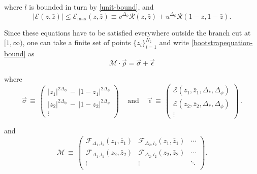 \documentclass[letterpaper]{article}
\numberwithin{equation}{section}
\begin{document}
where $l$ is bounded in turn by
  \ref{unit-bound}, and 
\begin{equation}
\label{error-bound}
  |\mathcal{E}(z,\bar z)| \leq \mathcal{E}_{\mathrm{max}}(z,\bar z) \equiv
  v^{\Delta_\phi}\mathcal{R}(z,\bar z)
  +
  u^{\Delta_\phi}\mathcal{R}(1-z,1-\bar z).
\end{equation} 

Since these equations have to be satisfied everywhere outside the branch cut at
\([1,\infty)\), one can take a finite set of points $\{z_i\}_{i=1}^{N_z}$ and
write \ref{bootstrapequation-bound} as
\begin{equation}
  \mathcal{M}\cdot \vec{\rho} = \vec{\sigma} + \vec{\epsilon}
\label{matrix-boo}
\end{equation}

where 
\begin{equation}
\vec{\sigma} \, \equiv \, \left( \begin{matrix}
                      |z_1|^{2\Delta_\phi} \, - \, |1-z_1|^{2 \Delta_\phi}\\  |z_2|^{2\Delta_\phi} \, - \, |1-z_2|^{2 \Delta_\phi} \\ \vdots
                     \end{matrix} \right) 
                     \quad \, \text{and} \, \quad 
                      \vec{\epsilon} \, \equiv \, 
                          \left( \begin{matrix}
                                  \mathcal{E}(z_1,\bar z_1,\Delta_*,\Delta_\phi) \\
                                  \mathcal{E}(z_2,\bar z_2,\Delta_*,\Delta_\phi) \\
                                  \vdots
                                 \end{matrix} \right)  \, .
\end{equation}

and
\begin{equation}
\mathcal{M} \, \equiv \, \left( \begin{matrix}
  \mathcal{F}_{\Delta_1,l_1}(z_1, \bar z_1) &\mathcal{F}_{\Delta_2,l_2}(z_1, \bar
  z_1) & \cdots \\
  \mathcal{F}_{\Delta_1,l_1}(z_2, \bar z_2) &\mathcal{F}_{\Delta_2,l_2}(z_2, \bar
  z_2) & \cdots \\
  \vdots  & \vdots &\ddots\\
                     \end{matrix} \right) .
                     \label{matrix-op}
\end{equation}
\end{document}
